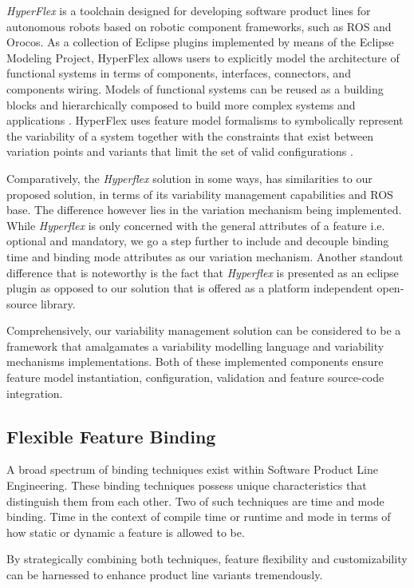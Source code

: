 \documentclass[conference]{IEEEtran}
\begin{document}
\textit{HyperFlex} is a toolchain designed for developing software product lines for autonomous robots based on robotic component frameworks, such as ROS and Orocos.
As a collection of Eclipse plugins implemented by means of the Eclipse Modeling Project, HyperFlex allows users to explicitly model the architecture of functional systems in terms of components, interfaces, connectors, and components wiring. Models of functional systems can be reused as a building blocks and hierarchically composed to build more complex systems and applications \cite{ros-ref}. HyperFlex uses feature model formalisms to symbolically represent the variability of a system together with the constraints that exist between variation points and variants that limit the set of valid configurations \cite{ros-ref}.

Comparatively, the \textit{Hyperflex} solution in some ways, has similarities to our proposed solution, in terms of its variability management capabilities and ROS base. The difference however lies in the variation mechanism being implemented. While \textit{Hyperflex} is only concerned with the general attributes of a feature i.e. optional and mandatory, we go a step further to include and decouple binding time and binding mode attributes as our variation mechanism. Another standout difference that is noteworthy is the fact that \textit{Hyperflex} is presented as an eclipse plugin as opposed to our solution that is offered as a platform independent open-source library.

Comprehensively, our variability management solution can be considered to be a framework that amalgamates a variability modelling language and variability mechanisms implementations. Both of these implemented components ensure feature model instantiation, configuration, validation and feature source-code integration.

\subsection{Flexible Feature Binding}
A broad spectrum of binding techniques exist within Software Product Line Engineering. These binding techniques possess unique characteristics that distinguish them from each other. Two of such techniques are time and mode binding. Time in the context of compile time or runtime and mode in terms of how static or dynamic a feature is allowed to be. 

By strategically combining both techniques, feature flexibility and customizability can be harnessed to enhance product line variants tremendously.
\end{document}
